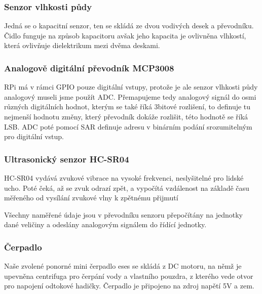 \documentclass[12pt,a4paper]{article}
\begin{document}
\subsubsection{Senzor vlhkosti půdy}

Jedná se o kapacitní senzor, ten se skládá ze dvou vodivých desek a převodníku.
Čidlo funguje na způsob kapacitoru avšak jeho kapacita je ovlivněna vlhkostí,
která ovlivňuje dielektrikum mezi dvěma deskami.

\subsubsection{Analogově digitální převodník MCP3008}

\ac{RPi} má v rámci \ac{GPIO} pouze digitální vstupy, protože je ale senzor
vlhkosti půdy
analogový museli jsme použít \ac{ADC}. Přemapujeme tedy analogový
signál
do
osmi různých digitálních hodnot, kterým se také říká 3bitové rozlišení, to
definuje tu nejmenší hodnotu změny, který převodník dokáže rozlišit, této
hodnotě se říká \ac{LSB}. \ac{ADC} poté pomocí \ac{SAR}
definuje adresu v binárním podání srozumitelným pro digitální vstup.


\subsubsection{Ultrasonický senzor HC-SR04}

\ac{HC-SR04} vydává zvukové vibrace na vysoké frekvenci, neslyšitelné pro
lidské
ucho. Poté čeká, až se zvuk odrazí zpět, a vypočítá vzdálenost na základě času
měřeného od vysílání zvukové vlny k zpětnému přijmutí

Všechny naměřené údaje jsou v převodníku senzoru přepočítány na jednotky dané
veličiny a odeslány analogovým signálem do řídící jednotky.

\subsubsection{Čerpadlo}

Naše zvolené ponorné mini čerpadlo eses se skládá z DC motoru, na němž je
upevněna centrifuga pro
čerpání vody a vlastního pouzdra, z kterého vede otvor pro napojení odtokové
hadičky. Čerpadlo je připojeno na zdroj napětí 5V a zem.
\end{document}
